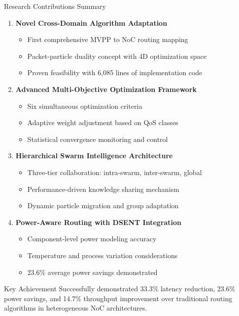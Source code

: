\documentclass[10pt,aspectratio=169]{beamer}
\begin{document}
\begin{frame}{Research Contributions Summary}
    \begin{enumerate}
        \item \textbf{Novel Cross-Domain Algorithm Adaptation}
        \begin{itemize}
            \item First comprehensive MVPP to NoC routing mapping
            \item Packet-particle duality concept with 4D optimization space
            \item Proven feasibility with 6,085 lines of implementation code
        \end{itemize}
        
        \item \textbf{Advanced Multi-Objective Optimization Framework}
        \begin{itemize}
            \item Six simultaneous optimization criteria
            \item Adaptive weight adjustment based on QoS classes
            \item Statistical convergence monitoring and control
        \end{itemize}
        
        \item \textbf{Hierarchical Swarm Intelligence Architecture}
        \begin{itemize}
            \item Three-tier collaboration: intra-swarm, inter-swarm, global
            \item Performance-driven knowledge sharing mechanism
            \item Dynamic particle migration and group adaptation
        \end{itemize}
        
        \item \textbf{Power-Aware Routing with DSENT Integration}
        \begin{itemize}
            \item Component-level power modeling accuracy
            \item Temperature and process variation considerations
            \item 23.6\% average power savings demonstrated
        \end{itemize}
    \end{enumerate}
    
    \begin{alertblock}{Key Achievement}
        Successfully demonstrated 33.3\% latency reduction, 23.6\% power savings, and 14.7\% throughput improvement over traditional routing algorithms in heterogeneous NoC architectures.
    \end{alertblock}
\end{frame}
\end{document}
